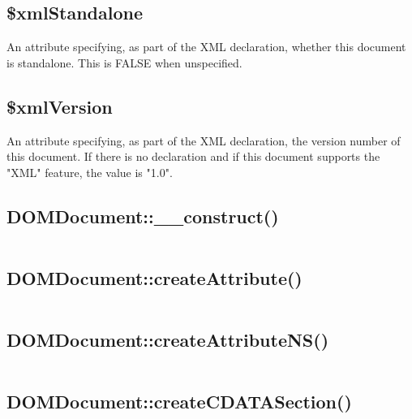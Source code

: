 \subsection{\$xmlStandalone}

An attribute specifying, as part of the XML declaration, whether this document is standalone. This is FALSE when unspecified.

\subsection{\$xmlVersion}

An attribute specifying, as part of the XML declaration, the version number of this document. If there is no declaration and if this document supports the "XML" feature, the value is "1.0".

\subsection{DOMDocument::\_\_construct()}


\begin{lstlisting}[language=PHP]

\end{lstlisting}


\subsection{DOMDocument::createAttribute()}



\begin{lstlisting}[language=PHP]

\end{lstlisting}

\subsection{DOMDocument::createAttributeNS()}



\begin{lstlisting}[language=PHP]

\end{lstlisting}

\subsection{DOMDocument::createCDATASection()}



